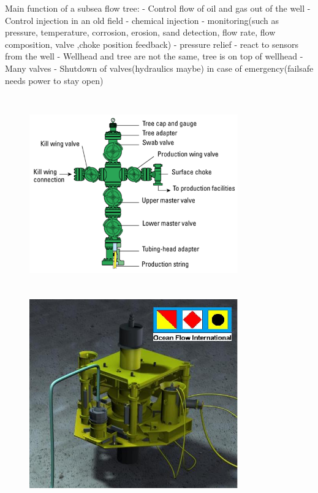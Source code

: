 \documentclass[DIV=calc, paper=a4, fontsize=13pt, twocolumn]{scrartcl}	 %
\begin{document}
Main function of a subsea flow tree:
- Control flow of oil and gas out of the well
- Control injection in an old field
- chemical injection
- monitoring(such as pressure, temperature, corrosion, erosion, sand detection, flow rate, flow composition, valve ,choke position feedback)
- pressure relief
- react to sensors from the well 
- Wellhead and tree are not the same, tree is on top of wellhead
- Many valves
- Shutdown of valves(hydraulics maybe) in case of emergency(failsafe needs power to stay open)
\begin{figure}[h]
\includegraphics[width=9cm,height=8.5cm]{xmas_tree_diagram.png}
\includegraphics[width=9cm,height=8.5cm]{Ocean_Flow_Subsea_Tree_002.JPG}
\end{figure}
\end{document}
